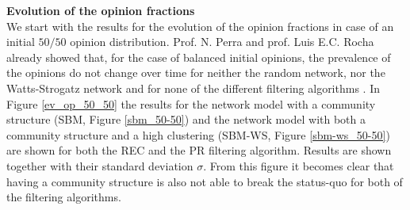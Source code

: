 \documentclass[11 pt , letterpaper , twoside , openright]{book}
\begin{document}
\textbf{Evolution of the opinion fractions}\\
\newline
We start with the results for the evolution of the opinion fractions in case of an initial $50/50$ opinion distribution. Prof. N. Perra and prof. Luis E.C. Rocha already showed that, for the case of balanced initial opinions, the prevalence of the opinions do not change over time for neither the random network, nor the Watts-Strogatz network and for none of the different filtering algorithms \cite{Perra2019}. In Figure \ref{ev_op_50_50} the results for the network model with a community structure (SBM, Figure \ref{sbm_50-50}) and the network model with both a community structure and a high clustering (SBM-WS, Figure \ref{sbm-ws_50-50}) are shown for both the REC and the PR filtering algorithm. Results are shown together with their standard deviation $\sigma$. From this figure it becomes clear that having a community structure is also not able to break the status-quo for both of the filtering algorithms. 
\end{document}
